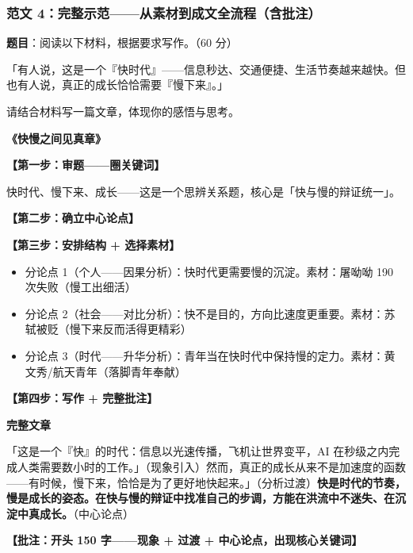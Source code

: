 \subsubsection{范文 4：完整示范——从素材到成文全流程（含批注）}

\textbf{题目}：阅读以下材料，根据要求写作。（60 分）

「有人说，这是一个『快时代』——信息秒达、交通便捷、生活节奏越来越快。但也有人说，真正的成长恰恰需要『慢下来』。」

请结合材料写一篇文章，体现你的感悟与思考。

\begin{center}
\textbf{\Large《快慢之间见真章》}
\end{center}

\textbf{【第一步：审题——圈关键词】}

快时代、慢下来、成长——这是一个思辨关系题，核心是「快与慢的辩证统一」。

\textbf{【第二步：确立中心论点】}


\textbf{【第三步：安排结构 + 选择素材】}

\begin{itemize}
  \item 分论点 1（个人——因果分析）：快时代更需要慢的沉淀。\textrightarrow 素材：屠呦呦 190 次失败（慢工出细活）
  \item 分论点 2（社会——对比分析）：快不是目的，方向比速度更重要。\textrightarrow 素材：苏轼被贬（慢下来反而活得更精彩）
  \item 分论点 3（时代——升华分析）：青年当在快时代中保持慢的定力。\textrightarrow 素材：黄文秀/航天青年（落脚青年奉献）
\end{itemize}

\textbf{【第四步：写作 + 完整批注】}

\begin{center}
\textbf{完整文章}
\end{center}

「这是一个『快』的时代：信息以光速传播，飞机让世界变平，AI 在秒级之内完成人类需要数小时的工作。」（现象引入）然而，真正的成长从来不是加速度的函数——有时候，慢下来，恰恰是为了更好地快起来。」（分析过渡）\textbf{快是时代的节奏，慢是成长的姿态。在快与慢的辩证中找准自己的步调，方能在洪流中不迷失、在沉淀中真成长。}（中心论点）

\textbf{【批注：开头 150 字——现象 + 过渡 + 中心论点，出现核心关键词】}


